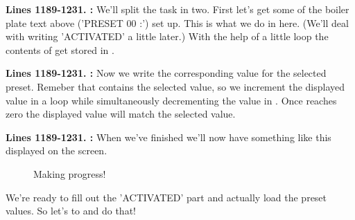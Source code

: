 \textbf{Lines 1189-1231. :} We'll split the task in two. First let's get some of the boiler plate text
above ('PRESET 00         :') set up. This is what we do in here. (We'll deal with writing 'ACTIVATED' a little later.) With the help of a little
loop the contents of  get stored in .

\textbf{Lines 1189-1231. :} Now we write the corresponding value for the selected preset. Remeber that
 contains the selected value, so we increment the displayed value in a loop while simultaneously decrementing the value in . Once
 reaches zero the displayed value will match the selected value.

\textbf{Lines 1189-1231. :} When we've finished we'll now have something like this displayed on the screen.
\begin{figure}[H]                                                          
  \centering                                                             
\caption{Making progress!}
\end{figure}                                                               
\vspace*{-0.7cm}

We're ready to fill out the 'ACTIVATED' part and actually load the preset values. So let's  to  and do that!

